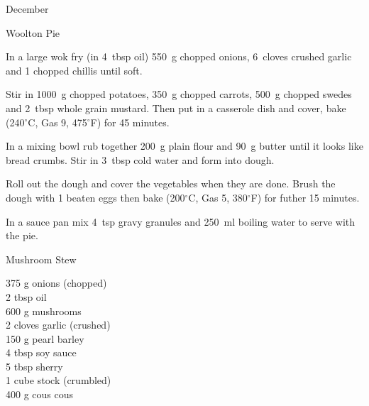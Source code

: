 \begin{menu}{December}
\begin{recipe}{2}{Woolton Pie}
    \begin{instructions}
    \item 
        In a large wok fry
        (in 4~tbsp  oil)
        550~g chopped onions,
        6~cloves crushed garlic
        and
        1 chopped chillis
        until soft.
      \item 
        Stir in
        1000~g chopped potatoes,
        350~g chopped carrots,
        500~g chopped swedes
        and
        2~tbsp  whole grain mustard.
        Then put in a casserole dish and cover,
        bake (240$^{\circ}$C, Gas 9, 475$^{\circ}$F) for 45 minutes.
      \item 
        In a mixing bowl
        rub together
        200~g  plain flour
        and
        90~g  butter
        until it looks like bread crumbs.
        Stir in
        3~tbsp  cold water
        and form into dough.
      \item 
        Roll out the dough and cover the vegetables when they are done.
        Brush the dough with 1 beaten eggs
        then bake (200$^{\circ}$C, Gas 5, 380$^{\circ}$F) for futher 15 minutes.
      \item 
        In a sauce pan mix
        4~tsp  gravy granules
        and
        250~ml  boiling water
        to serve with the pie.
      
    \end{instructions}
    \end{recipe}%
  
    \begin{recipe}{2}{Mushroom Stew}%
		\begin{ingredients}
		375 g onions (chopped) \\
	2 tbsp oil  \\
	600 g mushrooms  \\
	2 cloves garlic (crushed) \\
	150 g pearl barley  \\
	4 tbsp soy sauce  \\
	5 tbsp sherry  \\
	1 cube stock (crumbled) \\
	400 g cous cous  \\
	
		\end{ingredients}
	
	

\end{recipe}
\end{menu}
